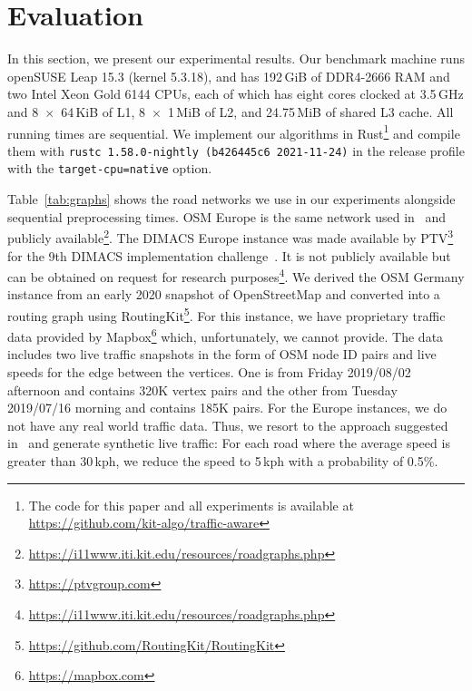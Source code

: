 \documentclass[a4paper,UKenglish,cleveref, autoref, thm-restate]{lipics-v2021}
\begin{document}
\section{Evaluation}\label{sec:eval}

In this section, we present our experimental results.
Our benchmark machine runs openSUSE Leap 15.3 (kernel 5.3.18), and has 192\,GiB of DDR4-2666 RAM and two Intel Xeon Gold 6144 CPUs, each of which has eight cores clocked at 3.5\,GHz and 8~$\times$~64\,KiB of L1, 8~$\times$~1\,MiB of L2, and 24.75\,MiB of shared L3 cache.
All running times are sequential.
We implement our algorithms in Rust\footnote{The code for this paper and all experiments is available at \url{https://github.com/kit-algo/traffic-aware}} and compile them with \texttt{rustc 1.58.0-nightly (b426445c6 2021-11-24)} in the release profile with the \texttt{target-cpu=native} option.

\begin{table}
\centering
\caption{
Instances used in the evaluation with sequential preprocessing running times to construct a CCH-Potential.
Phase 1 needs to be run only once for each graph, Phase 2 once for each weight function, or when a weight function changes.
}\label{tab:graphs}

\end{table}

Table~\ref{tab:graphs} shows the road networks we use in our experiments alongside sequential preprocessing times.
OSM Europe is the same network used in~\cite{dss-tarrn-18} and publicly available\footnote{\url{https://i11www.iti.kit.edu/resources/roadgraphs.php}}.
The DIMACS Europe instance was made available by PTV\footnote{\url{https://ptvgroup.com}} for the 9th DIMACS implementation challenge~\cite{DemetrescuGJ09}.
It is not publicly available but can be obtained on request for research purposes\footnote{\url{https://i11www.iti.kit.edu/resources/roadgraphs.php}}.
We derived the OSM Germany instance from an early 2020 snapshot of OpenStreetMap and converted into a routing graph using RoutingKit\footnote{\url{https://github.com/RoutingKit/RoutingKit}}.
For this instance, we have proprietary traffic data provided by Mapbox\footnote{\url{https://mapbox.com}} which, unfortunately, we cannot provide.
The data includes two live traffic snapshots in the form of OSM node ID pairs and live speeds for the edge between the vertices.
One is from Friday 2019/08/02 afternoon and contains 320K vertex pairs and the other from Tuesday 2019/07/16 morning and contains 185K pairs.
For the Europe instances, we do not have any real world traffic data.
Thus, we resort to the approach suggested in~\cite{dss-tarrn-18} and generate synthetic live traffic:
For each road where the average speed is greater than 30\,kph, we reduce the speed to 5\,kph with a probability of 0.5\%.
\end{document}
